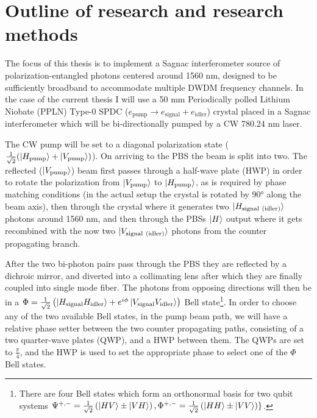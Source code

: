 \documentclass{article}
\theoremstyle{mytheoremstyle}
\theoremstyle{mytheoremstyle}
\theoremstyle{myproblemstyle}
\begin{document}
\section{Outline of research and research methods}
The focus of this thesis is to implement a Sagnac interferometer source of polarization-entangled photons centered around 1560 nm,
designed to be sufficiently broadband to accommodate multiple DWDM frequency channels.
In the case of the current thesis I will use a 50 mm Periodically polled Lithium Niobate (PPLN)
Type-0 SPDC ($e_{\mathrm{pump}} \rightarrow e_{\mathrm{signal}} + e_{\mathrm{idler}}$) crystal placed in a Sagnac interferometer
which will be bi-directionally pumped by a CW 780.24 nm laser.
\par The CW pump will be set to a diagonal polarization state ($\frac{1}{\sqrt{2}}(\ket{H_{\mathrm{pump}}} + \ket{V_{\mathrm{pump}}})$). On arriving to the
PBS the beam is split into two. The reflected ($\ket{V_{\mathrm{pump}}}$) beam first passes through a half-wave plate (HWP) in order to rotate the
polarization from $\ket{V_{\mathrm{pump}}}$ to $\ket{H_{\mathrm{pump}}}$, as is required by phase matching conditions (in the actual setup the crystal is rotated by 90° along the beam axis), then through
the crystal where it generates two $\ket{H_{\mathrm{signal}\ (\mathrm{idler})}}$ photons around 1560 nm, and then through the PBSs $\ket{H}$ output where it gets recombined
with the now two $\ket{V_{\mathrm{signal}\ (\mathrm{idler})}}$ photons from the counter propagating branch.

After the two bi-photon pairs pass through the PBS they are reflected by a dichroic mirror, and diverted into a collimating lens
after which they are finally coupled into single mode fiber. The photons from opposing directions will then be in a
$\Phi = \frac{1}{\sqrt{2}}\left( \ket{H_{\mathrm{signal}}H_{\mathrm{idler}}} + e^{i \phi}\ket{V_{\mathrm{signal}}V_{\mathrm{idler}}}\right)$ Bell state\footnote{There
	are four Bell states which form an orthonormal basis for two qubit systems
	$\Psi^{+,-}=\frac{1}{\sqrt{2}}\left(\ket{HV} \pm \ket{VH}\right),\\\Phi^{+,-} = \frac{1}{\sqrt{2}} \left( \ket{HH} \pm \ket{VV} \right)\}$.}.
In order to choose any of the two available Bell states, in the pump beam path, we will have
a relative phase setter between the two counter propagating paths, consisting of a two quarter-wave plates (QWP), and a HWP between them.
The QWPs are set to $\frac{\pi}{4}$, and the HWP is used to set the appropriate phase to select one of the $\Phi$ Bell states.
\end{document}
